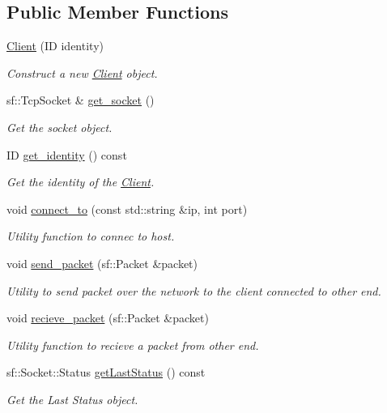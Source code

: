 \subsection*{Public Member Functions}
\begin{DoxyCompactItemize}
\item 
\hyperlink{classcp_1_1_client_ae0c68ae53a2bb2ce6b2d90ee751ce2a2}{Client} (ID identity)
\begin{DoxyCompactList}\small\item\em Construct a new \hyperlink{classcp_1_1_client}{Client} object. \end{DoxyCompactList}\item 
sf\+::\+Tcp\+Socket \& \hyperlink{classcp_1_1_client_a00d100072786f290ef74aa13fa19eb4c}{get\+\_\+socket} ()
\begin{DoxyCompactList}\small\item\em Get the socket object. \end{DoxyCompactList}\item 
ID \hyperlink{classcp_1_1_client_af18deba2fb9aff79c9221ab4d89f4120}{get\+\_\+identity} () const
\begin{DoxyCompactList}\small\item\em Get the identity of the \hyperlink{classcp_1_1_client}{Client}. \end{DoxyCompactList}\item 
void \hyperlink{classcp_1_1_client_a6da5c65dc07b98f84b221c3a80e23c96}{connect\+\_\+to} (const std\+::string \&ip, int port)
\begin{DoxyCompactList}\small\item\em Utility function to connec to host. \end{DoxyCompactList}\item 
void \hyperlink{classcp_1_1_client_a8f0775eeb130ae6aa5cc67978b6e0ca5}{send\+\_\+packet} (sf\+::\+Packet \&packet)
\begin{DoxyCompactList}\small\item\em Utility to send packet over the network to the client connected to other end. \end{DoxyCompactList}\item 
void \hyperlink{classcp_1_1_client_a7b52fd5525cdb44e6238c617baa08a68}{recieve\+\_\+packet} (sf\+::\+Packet \&packet)
\begin{DoxyCompactList}\small\item\em Utility function to recieve a packet from other end. \end{DoxyCompactList}\item 
sf\+::\+Socket\+::\+Status \hyperlink{classcp_1_1_client_acbb62103eeab8e6bdf2bd978396b352d}{get\+Last\+Status} () const
\begin{DoxyCompactList}\small\item\em Get the Last Status object. \end{DoxyCompactList}\end{DoxyCompactItemize}
